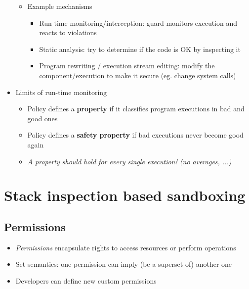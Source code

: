 \documentclass[12pt,titlepage,a4paper]{report}
\begin{document}
\begin{itemize}
\begin{itemize}
\begin{itemize}
			\end{itemize}
			\item Example mechanisms
			\begin{itemize}
				\item Run-time monitoring/interception: guard monitors execution and reacts to violations
				\item Static analysis: try to determine if the code is OK by inspecting it
				\item Program rewriting / execution stream editing: modify the component/execution to make it secure (eg. change system calls)
			\end{itemize}
		\end{itemize}
		\item Limits of run-time monitoring
		\begin{itemize}
			\item Policy defines a \textbf{property} if it classifies program executions in bad and good ones
			\item Policy defines a \textbf{safety property} if bad executions never become good again
			\item[\textrightarrow] \emph{A property should hold for every single execution! (no averages, ...)}
		\end{itemize}
	\end{itemize}

	\section{Stack inspection based sandboxing}
	\subsection{Permissions}
	\begin{itemize}
		\item \textit{Permissions} encapsulate rights to access resources or perform operations
		\item Set semantics: one permission can imply (be a superset of) another one
		\item Developers can define new custom permissions
	\end{itemize}
\end{document}
